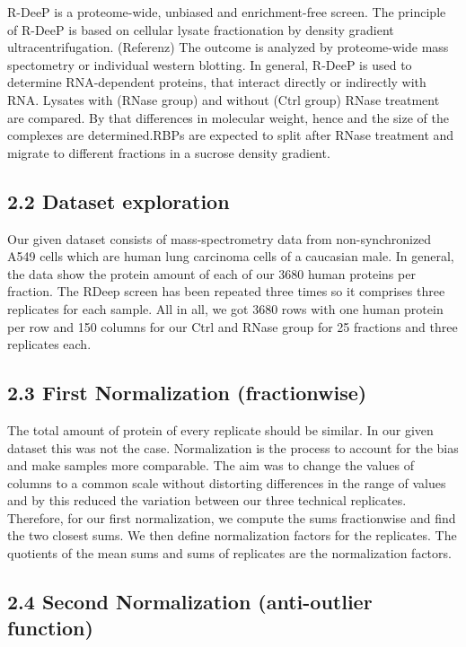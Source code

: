 \documentclass[
]{article}
\begin{document}
R-DeeP is a proteome-wide, unbiased and enrichment-free screen. The
principle of R-DeeP is based on cellular lysate fractionation by density
gradient ultracentrifugation. (Referenz) The outcome is analyzed by
proteome-wide mass spectometry or individual western blotting. In
general, R-DeeP is used to determine RNA-dependent proteins, that
interact directly or indirectly with RNA. Lysates with (RNase group) and
without (Ctrl group) RNase treatment are compared. By that differences
in molecular weight, hence and the size of the complexes are
determined.RBPs are expected to split after RNase treatment and migrate
to different fractions in a sucrose density gradient.

\hypertarget{dataset-exploration}{%
\subsection{2.2 Dataset exploration}\label{dataset-exploration}}

Our given dataset consists of mass-spectrometry data from
non-synchronized A549 cells which are human lung carcinoma cells of a
caucasian male. In general, the data show the protein amount of each of
our 3680 human proteins per fraction. The RDeep screen has been repeated
three times so it comprises three replicates for each sample. All in
all, we got 3680 rows with one human protein per row and 150 columns for
our Ctrl and RNase group for 25 fractions and three replicates each.

\hypertarget{first-normalization-fractionwise}{%
\subsection{2.3 First Normalization
(fractionwise)}\label{first-normalization-fractionwise}}

The total amount of protein of every replicate should be similar. In our
given dataset this was not the case. Normalization is the process to
account for the bias and make samples more comparable. The aim was to
change the values of columns to a common scale without distorting
differences in the range of values and by this reduced the variation
between our three technical replicates. Therefore, for our first
normalization, we compute the sums fractionwise and find the two closest
sums. We then define normalization factors for the replicates. The
quotients of the mean sums and sums of replicates are the normalization
factors.

\hypertarget{second-normalization-anti-outlier-function}{%
\subsection{2.4 Second Normalization (anti-outlier
function)}\label{second-normalization-anti-outlier-function}}
\end{document}

